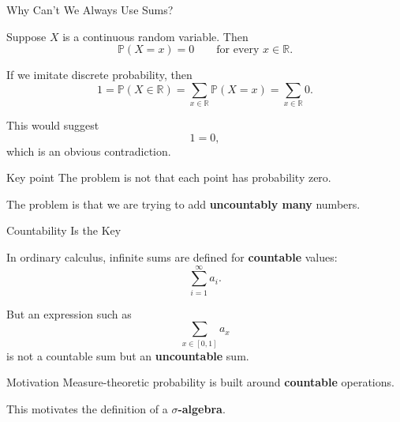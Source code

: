 \documentclass [aspectratio=169]{beamer}
\begin{document}
\begin{frame}{Why Can't We Always Use Sums?}

Suppose $X$ is a continuous random variable. Then
\[
    \mathbb P(X=x)=0
    \qquad
    \text{for every } x \in \mathbb R.
\]

\vspace{2mm}

If we imitate discrete probability, then
\[
    1= \mathbb P(X \in \mathbb{R})
    =
    \sum_{x \in \mathbb{R}} \mathbb P(X=x)
    =
    \sum_{x \in \mathbb{R}} 0.
\]

\vspace{2mm}

This would suggest
\[
    1=0,
\]
which is an obvious contradiction.

\vspace{3mm}

\begin{block}{Key point}
The problem is not that each point has probability zero.

The problem is that we are trying to add \textbf{uncountably many} numbers.
\end{block}


\end{frame}

\begin{frame}{Countability Is the Key}

In ordinary calculus, infinite sums are defined for \textbf{countable} values:
\[
    \sum_{i=1}^{\infty} a_i.
\]

But an expression such as
\[
    \sum_{x \in [0,1]} a_x
\]
is not a countable sum but an \textbf{uncountable} sum.

\vspace{3mm}

\begin{block}{Motivation}
Measure-theoretic probability is built around \textbf{countable} operations.

This motivates the definition of a \textbf{$\sigma$-algebra}.
\end{block}

\end{frame}
\end{document}
